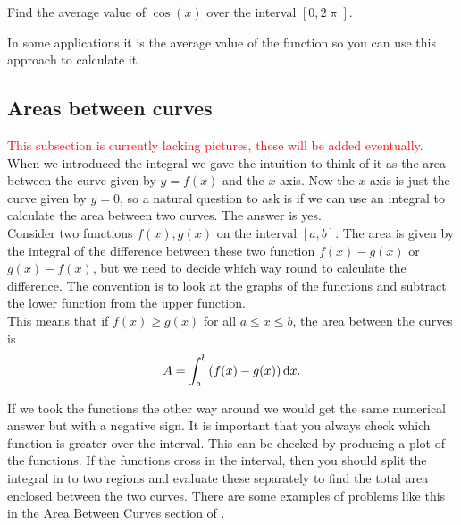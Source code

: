 \begin{exercise}
Find the average value of $\cos(x)$ over the interval $[0,2\uppi]$.
\end{exercise}

In some applications it is the average value of the function so you can use this approach to calculate it.

\subsection*{Areas between curves}
\textcolor{red}{This subsection is currently lacking pictures, these will be added eventually.}\\


When we introduced the integral we gave the intuition to think of it as the area between the curve given by $y=f(x)$ and the $x$-axis.  Now the $x$-axis is just the curve given by $y=0$, so a natural question to ask is if we can use an integral to calculate the area between two curves. The answer is yes. \\

Consider two functions $f(x),g(x)$ on the interval $[a,b]$. The area is given by the integral of the difference between these two function $f(x)-g(x)$ or $g(x)-f(x)$, but we need to decide which way round to calculate the difference. The convention is to look at the graphs of the functions and subtract the lower function from the upper function.\\

This means that if $f(x)\geq g(x)$ for all $a\leq x\leq b$, the area between the curves is
\begin{equation}
A=\int_{a}^{b}\left(f(x)-g(x)\right)\mathrm{d} x.
\label{eq: integral for area}
\end{equation}

If we took the functions the other way around we would get the same numerical answer but with a negative sign. It is important that you always check which function is greater over the interval. This can be checked by producing a plot of the functions. If the functions cross in the interval, then you should split the integral in to two regions and evaluate these separately to find the total area enclosed between the two curves. There are some examples of problems like this in the Area Between Curves section of \cite{calcI}.

